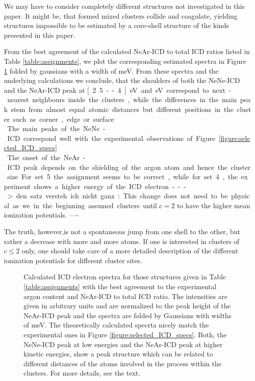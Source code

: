 We may have to consider completely different structures not investigated in this
paper. It might be, that formed mixed clusters collide and coagulate, yielding
structures impossible to be estimated by a core-shell structure of the kinds
presented in this paper. 

From the best agreement of the calculated NeAr-ICD to total ICD ratios listed in Table
\ref{table:assignments}, we plot the corresponding estimated spectra in Figure
\ref{figure:theo_specs} folded by gaussians with a width of \unit[250]{meV}.
From these spectra and the underlying calculations
we conclude, that the shoulders of both the NeNe-ICD and the NeAr-ICD peak
at \unit[2.5--4]{eV} and \unit[8--10]{eV}
correspond to next-nearest neighbours inside the clusters, while the differences
in the main peak stem from almost equal atomic distances but different positions
in the cluster such as corner, edge or surface.\\
The main peaks of the NeNe-ICD correspond well with the experimental observations
of Figure \ref{figure:selected_ICD_specs}.\\
The onset of the NeAr-ICD peak depends on the shielding of the argon atom
and hence the cluster size. For set 5 the assignment seems to be correct, while
for set 4, the experiment shows a higher energy of the ICD electron. 

---> den satz versteh ich nicht ganz:
This change does not need to be physical as we in the beginning assumed clusters
until $c=2$ to have the higher mean ionization potentials. 
----

The truth, however,is not a spontaneous jump from one shell to the other, but rather a decrease
with more and more atoms. If one is interested in clusters of $c\le2$ only, one
should take care of a more detailed description of the different ionization
potentials for different cluster sites.\\

\begin{figure}[!ht]
  \centering
  
  \caption{Calculated ICD electron spectra for those structures given in Table
           \ref{table:assignments} with the best agreement to the experimental
           argon content and NeAr-ICD to total ICD ratio. The intensities are given
           in arbitrary units and are normalized to the peak height of the NeAr-ICD
           peak and the spectra are folded by Gaussians with widths of \unit[250]{meV}.
           The theoretically calculated specrta nicely match the experimental ones in Figure
           \ref{figure:selected_ICD_specs}.
           Both, the NeNe-ICD peak at low energies and the NeAr-ICD peak
           at higher kinetic energies, show a peak structure which can be related
           to different distances of the atoms involved in the process within the
           clusters. For more details, see the text.}
  \label{figure:theo_specs}
\end{figure}
